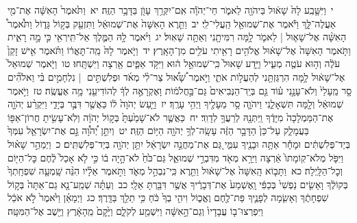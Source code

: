 \documentclass[18pt]{article}
\begin{document}
 {\loc י~}וַיִּשָּׁ֤בַֽע לָהּ֙ שָׁא֔וּל בַּיהֹוָ֖ה לֵאמֹ֑ר חַי־יְהֹוָ֕ה אִֽם־יִקְּרֵ֥ךְ עָוֺ֖ן בַּדָּבָ֥ר הַזֶּֽה׃ \startlock
 {\loc יא~}וַתֹּ֙אמֶר֙ הָאִשָּׁ֔ה אֶת־מִ֖י אַעֲלֶה־לָּ֑ךְ וַיֹּ֕אמֶר אֶת־שְׁמוּאֵ֖ל הַֽעֲלִי־לִֽי׃ \startlock
 {\loc יב~}וַתֵּ֤רֶא הָאִשָּׁה֙ אֶת־שְׁמוּאֵ֔ל וַתִּזְעַ֖ק בְּק֣וֹל גָּד֑וֹל וַתֹּ֩אמֶר֩ הָאִשָּׁ֨ה אֶל־שָׁא֧וּל  |  לֵאמֹ֛ר לָ֥מָּה רִמִּיתָ֖נִי וְאַתָּ֥ה שָׁאֽוּל׃ \startlock
 {\loc יג~}וַיֹּ֨אמֶר לָ֥הּ הַמֶּ֛לֶךְ אַל־תִּֽירְאִ֖י כִּ֣י מָ֣ה רָאִ֑ית וַתֹּ֤אמֶר הָאִשָּׁה֙ אֶל־שָׁא֔וּל אֱלֹהִ֥ים רָאִ֖יתִי עֹלִ֥ים מִן־הָאָֽרֶץ׃ \startlock
 {\loc יד~}וַיֹּ֤אמֶר לָהּ֙  מַֽה־תׇּאֳר֔וֹ  וַתֹּ֗אמֶר אִ֤ישׁ זָקֵן֙ עֹלֶ֔ה וְה֥וּא עֹטֶ֖ה מְעִ֑יל וַיֵּ֤דַע שָׁאוּל֙ כִּֽי־שְׁמוּאֵ֣ל ה֔וּא וַיִּקֹּ֥ד אַפַּ֛יִם אַ֖רְצָה וַיִּשְׁתָּֽחוּ׃ \startlock
 {\loc טו~}וַיֹּ֤אמֶר שְׁמוּאֵל֙ אֶל־שָׁא֔וּל לָ֥מָּה הִרְגַּזְתַּ֖נִי לְהַעֲל֣וֹת אֹתִ֑י וַיֹּ֣אמֶר שָׁ֠א֠וּל צַר־לִ֨י מְאֹ֜ד וּפְלִשְׁתִּ֣ים  |  נִלְחָמִ֣ים בִּ֗י וֵאלֹהִ֞ים סָ֤ר מֵֽעָלַי֙ וְלֹא־עָנָ֣נִי ע֗וֹד גַּ֤ם בְּיַֽד־הַנְּבִיאִים֙ גַּם־בַּ֣חֲלֹמ֔וֹת וָאֶקְרָאֶ֣ה לְךָ֔ לְהוֹדִיעֵ֖נִי מָ֥ה אֶעֱשֶֽׂה׃ \startlock
 {\loc טז~}וַיֹּ֣אמֶר שְׁמוּאֵ֔ל וְלָ֖מָּה תִּשְׁאָלֵ֑נִי וַיהֹוָ֛ה סָ֥ר מֵעָלֶ֖יךָ וַיְהִ֥י עָרֶֽךָ׃ \startlock
 {\loc יז~}וַיַּ֤עַשׂ יְהֹוָה֙ ל֔וֹ כַּאֲשֶׁ֖ר דִּבֶּ֣ר בְּיָדִ֑י וַיִּקְרַ֨ע יְהֹוָ֤ה אֶת־הַמַּמְלָכָה֙ מִיָּדֶ֔ךָ וַֽיִּתְּנָ֖הּ לְרֵעֲךָ֥ לְדָוִֽד׃ \startlock
 {\loc יח~}כַּאֲשֶׁ֤ר לֹא־שָׁמַ֙עְתָּ֙ בְּק֣וֹל יְהֹוָ֔ה וְלֹֽא־עָשִׂ֥יתָ חֲרוֹן־אַפּ֖וֹ בַּעֲמָלֵ֑ק עַל־כֵּן֙ הַדָּבָ֣ר הַזֶּ֔ה עָשָֽׂה־לְךָ֥ יְהֹוָ֖ה הַיּ֥וֹם הַזֶּֽה׃ \startlock
 {\loc יט~}וְיִתֵּ֣ן יְ֠הֹוָ֠ה גַּ֣ם אֶת־יִשְׂרָאֵ֤ל עִמְּךָ֙ בְּיַד־פְּלִשְׁתִּ֔ים וּמָחָ֕ר אַתָּ֥ה וּבָנֶ֖יךָ עִמִּ֑י גַּ֚ם אֶת־מַחֲנֵ֣ה יִשְׂרָאֵ֔ל יִתֵּ֥ן יְהֹוָ֖ה בְּיַד־פְּלִשְׁתִּֽים׃ \startlock
 {\loc כ~}וַיְמַהֵ֣ר שָׁא֗וּל וַיִּפֹּ֤ל מְלֹא־קֽוֹמָתוֹ֙ אַ֔רְצָה וַיִּרָ֥א מְאֹ֖ד מִדִּבְרֵ֣י שְׁמוּאֵ֑ל גַּם־כֹּ֙חַ֙ לֹא־הָ֣יָה ב֔וֹ כִּ֣י לֹ֤א אָכַל֙ לֶ֔חֶם כׇּל־הַיּ֖וֹם וְכׇל־הַלָּֽיְלָה׃ \startlock
 {\loc כא~}וַתָּב֤וֹא הָֽאִשָּׁה֙ אֶל־שָׁא֔וּל וַתֵּ֖רֶא כִּֽי־נִבְהַ֣ל מְאֹ֑ד וַתֹּ֣אמֶר אֵלָ֗יו הִנֵּ֨ה שָֽׁמְעָ֤ה שִׁפְחָֽתְךָ֙ בְּקוֹלֶ֔ךָ וָאָשִׂ֤ים נַפְשִׁי֙ בְּכַפִּ֔י וָֽאֶשְׁמַע֙ אֶת־דְּבָרֶ֔יךָ אֲשֶׁ֥ר דִּבַּ֖רְתָּ אֵלָֽי׃ \startlock
 {\loc כב~}וְעַתָּ֗ה שְׁמַֽע־נָ֤א גַם־אַתָּה֙ בְּק֣וֹל שִׁפְחָתֶ֔ךָ וְאָשִׂ֧מָה לְפָנֶ֛יךָ פַּת־לֶ֖חֶם וֶאֱכ֑וֹל וִיהִ֤י בְךָ֙ כֹּ֔חַ כִּ֥י תֵלֵ֖ךְ בַּדָּֽרֶךְ׃ \startlock
 {\loc כג~}וַיְמָאֵ֗ן וַיֹּ֙אמֶר֙ לֹ֣א אֹכַ֔ל וַיִּפְרְצוּ־ב֤וֹ עֲבָדָיו֙ וְגַם־הָ֣אִשָּׁ֔ה וַיִּשְׁמַ֖ע לְקֹלָ֑ם וַיָּ֙קׇם֙ מֵֽהָאָ֔רֶץ וַיֵּ֖שֶׁב אֶל־הַמִּטָּֽה׃ \startlock
\end{document}
